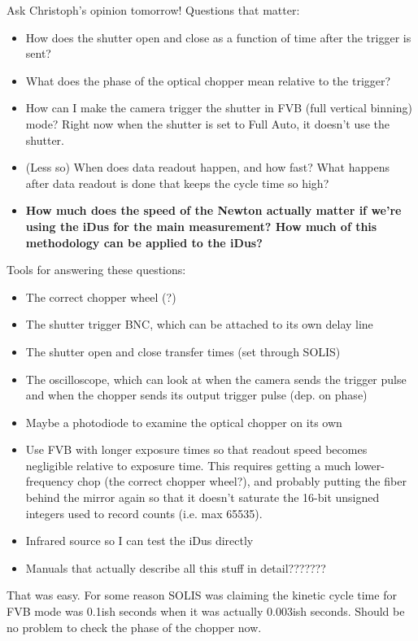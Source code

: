 \documentclass[11pt]{labbook}
\begin{document}
Ask Christoph's opinion tomorrow! Questions that matter:
\begin{itemize}
\item How does the shutter open and close as a function of time after the trigger is sent?
\item What does the phase of the optical chopper mean relative to the trigger?
\item How can I make the camera trigger the shutter in FVB (full vertical binning) mode? Right now when the shutter is set to Full Auto, it doesn't use the shutter.
\item (Less so) When does data readout happen, and how fast? What happens after data readout is done that keeps the cycle time so high?
\item \textbf{How much does the speed of the Newton actually matter if we're using the iDus for the main measurement? How much of this methodology can be applied to the iDus?}
\end{itemize}
Tools for answering these questions:
\begin{itemize}
\item The correct chopper wheel (?)
\item The shutter trigger BNC, which can be attached to its own delay line
\item The shutter open and close transfer times (set through SOLIS)
\item The oscilloscope, which can look at when the camera sends the trigger pulse and when the chopper sends its output trigger pulse (dep. on phase)
\item Maybe a photodiode to examine the optical chopper on its own
\item Use FVB with longer exposure times so that readout speed becomes negligible relative to exposure time. This requires getting a much lower-frequency chop (the correct chopper wheel?), and probably putting the fiber behind the mirror again so that it doesn't saturate the 16-bit unsigned integers used to record counts (i.e. max 65535).
\item Infrared source so I can test the iDus directly
\item Manuals that actually describe all this stuff in detail???????
\end{itemize}


That was easy. For some reason SOLIS was claiming the kinetic cycle time for FVB mode was 0.1ish seconds when it was actually 0.003ish seconds. Should be no problem to check the phase of the chopper now.
\end{document}
